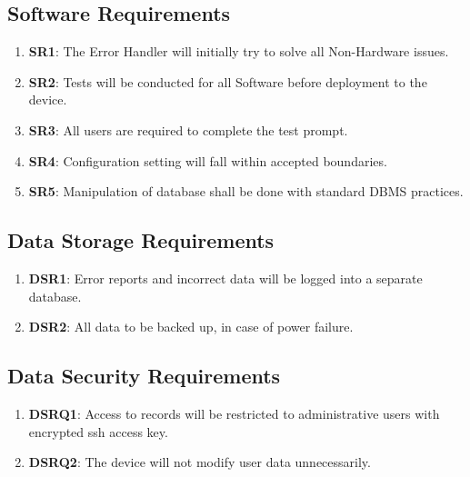 \documentclass{article}
\begin{document}
\subsection{Software  Requirements}
\begin{enumerate}
	\item\label{SR1}\textbf{SR1}: The Error Handler will initially try to solve all Non-Hardware issues.\\
	\item\label{SR2}\textbf{SR2}: Tests will be conducted for all Software before deployment to the device.\\
	\item\label{SR3}\textbf{SR3}: All users are required to complete the test prompt.\\
	\item\label{SR4}\textbf{SR4}: Configuration setting will fall within accepted boundaries.\\
	\item\label{SR5}\textbf{SR5}: Manipulation of database shall be done with standard DBMS practices.\\
\end{enumerate}

\subsection{Data Storage Requirements }
\begin{enumerate}
	\item\label{DSR1}\textbf{DSR1}: Error reports and incorrect data will be logged into a separate database.\\
	\item\label{DSR2}\textbf{DSR2}: All data to be backed up, in case of power failure.\\
\end{enumerate}


\subsection{Data Security Requirements }
\begin{enumerate}
	\item\label{DSRQ1}\textbf{DSRQ1}: 	Access to records will be restricted to administrative users with encrypted ssh access key.\\
	\item\label{DSRQ2}\textbf{DSRQ2}: 	The device will not modify user data unnecessarily.\\ 	
\end{enumerate}
\end{document}
